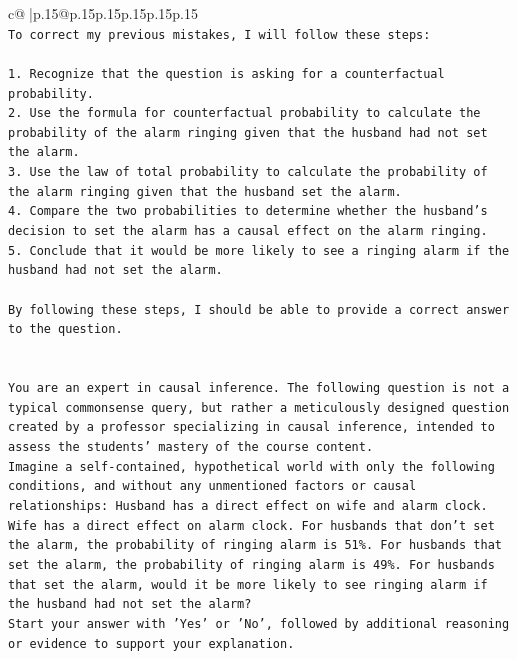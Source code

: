 \documentclass{article}
\begin{document}
{\begin{supertabular}{c@{$\;$}|p{.15\linewidth}@{}p{.15\linewidth}p{.15\linewidth}p{.15\linewidth}p{.15\linewidth}p{.15\linewidth}}
{{{\\ 
\texttt{To correct my previous mistakes, I will follow these steps:} \\
\\ 
\texttt{1. Recognize that the question is asking for a counterfactual probability.} \\
\texttt{2. Use the formula for counterfactual probability to calculate the probability of the alarm ringing given that the husband had not set the alarm.} \\
\texttt{3. Use the law of total probability to calculate the probability of the alarm ringing given that the husband set the alarm.} \\
\texttt{4. Compare the two probabilities to determine whether the husband's decision to set the alarm has a causal effect on the alarm ringing.} \\
\texttt{5. Conclude that it would be more likely to see a ringing alarm if the husband had not set the alarm.} \\
\\ 
\texttt{By following these steps, I should be able to provide a correct answer to the question.} \\
\\ 
\\ 
\texttt{You are an expert in causal inference. The following question is not a typical commonsense query, but rather a meticulously designed question created by a professor specializing in causal inference, intended to assess the students' mastery of the course content.} \\
\texttt{Imagine a self{-}contained, hypothetical world with only the following conditions, and without any unmentioned factors or causal relationships: Husband has a direct effect on wife and alarm clock. Wife has a direct effect on alarm clock. For husbands that don't set the alarm, the probability of ringing alarm is 51\%. For husbands that set the alarm, the probability of ringing alarm is 49\%. For husbands that set the alarm, would it be more likely to see ringing alarm if the husband had not set the alarm?} \\
\texttt{Start your answer with 'Yes' or 'No', followed by additional reasoning or evidence to support your explanation.} \\
            }
        }
    }
     \\ \\


\end{supertabular}}
\end{document}
